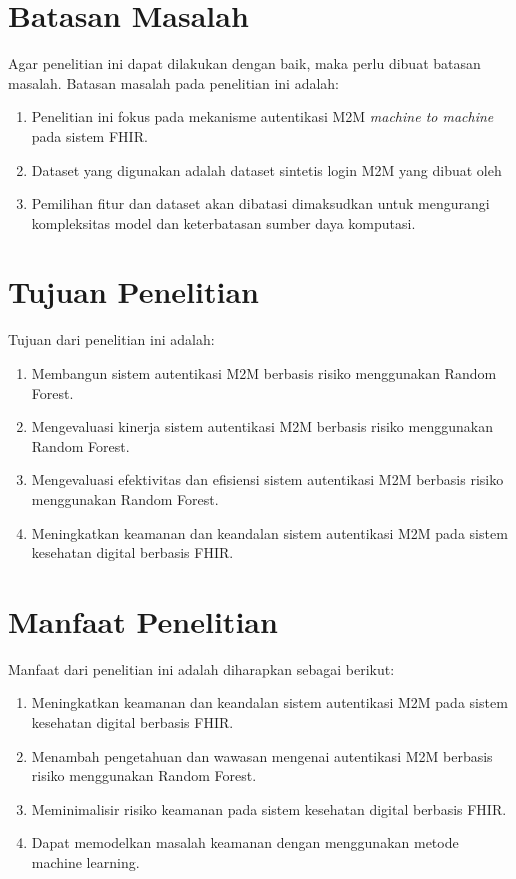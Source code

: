 \section{Batasan Masalah}
Agar penelitian ini dapat dilakukan dengan baik, maka perlu dibuat batasan masalah.
Batasan masalah pada penelitian ini adalah:
\begin{enumerate}
	\item Penelitian ini fokus pada mekanisme autentikasi M2M \textit{machine to machine} pada sistem FHIR.
	\item Dataset yang digunakan adalah dataset sintetis login M2M yang dibuat oleh \cite{steinegger_risk-based_2016}
	\item Pemilihan fitur dan dataset akan dibatasi dimaksudkan untuk mengurangi kompleksitas model dan keterbatasan sumber daya komputasi.
\end{enumerate}

\section{Tujuan Penelitian}
Tujuan dari penelitian ini adalah:
\begin{enumerate}
	\item Membangun sistem autentikasi M2M berbasis risiko menggunakan Random Forest.
	\item Mengevaluasi kinerja sistem autentikasi M2M berbasis risiko menggunakan Random Forest.
	\item Mengevaluasi efektivitas dan efisiensi sistem autentikasi M2M berbasis risiko menggunakan Random Forest.
	\item Meningkatkan keamanan dan keandalan sistem autentikasi M2M pada sistem kesehatan digital berbasis FHIR.
\end{enumerate}


\section{Manfaat Penelitian}
Manfaat dari penelitian ini adalah diharapkan sebagai berikut:
\begin{enumerate}
	\item Meningkatkan keamanan dan keandalan sistem autentikasi M2M pada sistem kesehatan digital berbasis FHIR.
	\item Menambah pengetahuan dan wawasan mengenai autentikasi M2M berbasis risiko menggunakan Random Forest.
	\item Meminimalisir risiko keamanan pada sistem kesehatan digital berbasis FHIR.
	\item Dapat memodelkan masalah keamanan dengan menggunakan metode machine learning.
\end{enumerate}
